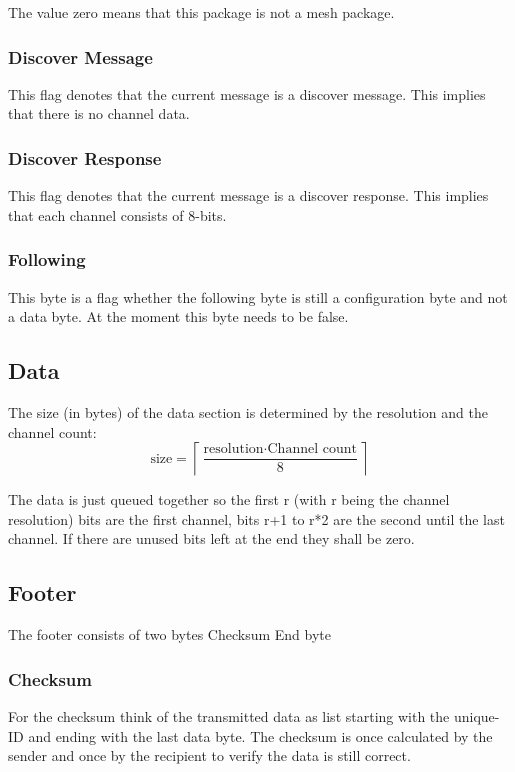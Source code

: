 \documentclass{scrreprt}
\begin{document}
The value zero means that this package is not a mesh package.

\subsubsection{Discover Message}
This flag denotes that the current message is a discover message. This implies that there is no
channel data.

\subsubsection{Discover Response}
This flag denotes that the current message is a discover response. This implies that each channel consists of 8-bits.

\subsubsection{Following}
This byte is a flag whether the following byte is still a configuration
byte and not a data byte. At the moment this byte needs to be false.

\subsection{Data}
The size (in bytes) of the data section is determined by
the resolution and the channel count:
\begin{equation}
  \text{size} = \left\lceil{\frac{\text{resolution} \cdot \text{Channel count}}{8}} \right\rceil
\end{equation}

The data is just queued together so the first r (with r being the channel
resolution) bits are the first channel, bits r+1 to r*2 are the second
until the last channel. If there are unused bits left at the end they shall be zero.

\subsection{Footer}
The footer consists of two bytes Checksum End byte

\subsubsection{Checksum}
For the checksum think of the transmitted data as list starting with the
unique-ID and ending with the last data byte. The checksum is once
calculated by the sender and once by the recipient to verify the data is
still correct.
\end{document}
